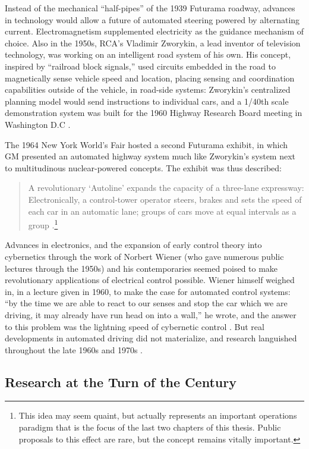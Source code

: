 Instead of the mechanical ``half-pipes'' of the 1939 Futurama roadway, advances in
technology would allow a future of automated steering powered
by alternating current. Electromagnetism supplemented electricity as the
guidance mechanism of choice. Also in the 1950s, RCA's
Vladimir Zworykin, a lead inventor of television technology, was
working on an intelligent road system of his own. His concept,
inspired by ``railroad block signals,'' used circuits embedded in the
road to magnetically sense vehicle speed and location, placing sensing
and coordination capabilities outside of the vehicle, in road-side
systems:  Zworykin's centralized planning model would send
instructions to individual cars, and a 1/40th scale demonstration
system was built for the 1960 Highway Research Board meeting in
Washington D.C \cite[p. 9]{wetmore}.

The 1964 New York World's Fair hosted a second Futurama exhibit, in
which GM presented an automated highway system much like Zworykin's
system next to multitudinous nuclear-powered concepts. The exhibit was
thus described: 
\begin{quote}A revolutionary `Autoline' expands the capacity of a three-lane
expressway: Electronically, a control-tower operator steers, brakes
and sets the speed of each car in an automatic lane; groups of cars
move at equal intervals as a group \cite[p. 9]{wetmore}.\footnote{This
idea may seem quaint, but actually represents an important operations
paradigm that is the focus of the last two chapters of this thesis.
Public proposals to this effect are rare, but the concept remains
vitally important.}\end{quote}
 Advances in
electronics, and the expansion of early control theory into
cybernetics through the work of Norbert Wiener (who gave numerous
public lectures through the 1950s) and his contemporaries seemed
poised to make revolutionary applications of electrical control
possible. Wiener himself weighed in, in a lecture given in 1960, to
make the case for automated control systems: ``by the time we are able
to react to our senses and stop the car which we are driving, it may
already have run head on into a wall,'' he wrote, and the answer to
this problem was the lightning speed of cybernetic control \cite{wienerOn}. But real
developments in automated driving did not materialize, and research
languished throughout the late 1960s and 1970s \cite[p. 10]{wetmore}.

\subsection{Research at the Turn of the Century}

